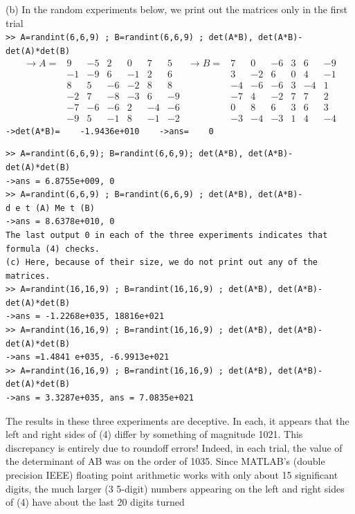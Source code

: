 \documentclass[../main.tex]{subfiles}
\begin{document}
(b) In the random experiments below, we print out the matrices only in the first trial\\
\texttt{>> A=randint(6,6,9) ; B=randint(6,6,9) ; det(A*B), det(A*B)-det(A)*det(B) }
$$
\begin{array}{rrrrrrr}
\rightarrow A= & 9 & -5 & 2 & 0 & 7 & 5 \\
& -1 & -9 & 6 & -1 & 2 & 6 \\
& 8 & 5 & -6 & -2 & 8 & 8 \\
& -2 & 7 & -8 & -3 & 6 & -9 \\
& -7 & -6 & -6 & 2 & -4 & -6 \\
& -9 & 5 & -1 & 8 & -1 & -2
\end{array}
\begin{array}{rrrrrrr}
\rightarrow B= & 7 & 0 & -6 & 3 & 6 & -9 \\
& 3 & -2 & 6 & 0 & 4 & -1 \\
& -4 & -6 & -6 & 3 & -4 & 1 \\
& -7 & 4 & -2 & 7 & 7 & 2 \\
& 0 & 8 & 6 & 3 & 6 & 3 \\
& -3 & -4 & -3 & 1 & 4 & -4
\end{array}
$$
\texttt{->det(A*B)=~~~ -1.9436e+010 ~~~->ans= ~~~0}
\begin{lstlisting}[numbers=none,frame=none]
>> A=randint(6,6,9); B=randint(6,6,9); det(A*B), det(A*B)-
det(A)*det(B) 
->ans = 6.8755e+009, 0 
>> A=randint(6,6,9) ; B=randint(6,6,9) ; det(A*B), det(A*B)-
d e t (A) Me t (B) 
->ans = 8.6378e+010, 0 
The last output 0 in each of the three experiments indicates that formula (4) checks. 
(c) Here, because of their size, we do not print out any of the matrices. 
>> A=randint(16,16,9) ; B=randint(16,16,9) ; det(A*B), det(A*B)-
det(A)*det(B) 
->ans = -1.2268e+035, 18816e+021 
>> A=randint(16,16,9) ; B=randint(16,16,9) ; det(A*B), det(A*B)-
det(A)*det(B) 
->ans =1.4841 e+035, -6.9913e+021 
>> A=randint(16,16,9) ; B=randint(16,16,9) ; det(A*B), det(A*B)-
det(A)*det(B) 
->ans = 3.3287e+035, ans = 7.0835e+021
\end{lstlisting}
The results in these three experiments are deceptive. In each, it appears that the left and right sides of 
(4) differ by something of magnitude 1021. This discrepancy is entirely due to roundoff errors! 
Indeed, in each trial, the value of the determinant of AB was on the order of 1035. Since MATLAB's 
(double precision IEEE) floating point arithmetic works with only about 15 significant digits, the much 
larger (3 5-digit) numbers appearing on the left and right sides of (4) have about the last 20 digits turned 
\end{document}
